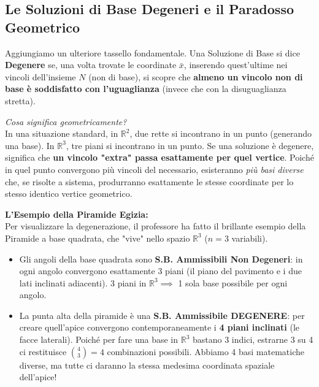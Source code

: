 \documentclass[12pt, a4paper]{article}
\newcommand{\separatore}{\noindent{\color{titlecolor!50}\rule{\textwidth}{0.6pt}}}
\begin{document}
	\vspace{0.6cm}
	\separatore
	\vspace{0.4cm}
	
	\subsection*{Le Soluzioni di Base Degeneri e il Paradosso Geometrico}
	
	Aggiungiamo un ulteriore tassello fondamentale. Una Soluzione di Base si dice \textbf{Degenere} se, una volta trovate le coordinate $\bar{x}$, inserendo quest'ultime nei vincoli dell'insieme $N$ (non di base), si scopre che \textbf{almeno un vincolo non di base è soddisfatto con l'uguaglianza} (invece che con la disuguaglianza stretta).
	
	\textit{Cosa significa geometricamente?}\\
	In una situazione standard, in $\mathbb{R}^2$, due rette si incontrano in un punto (generando una base). In $\mathbb{R}^3$, tre piani si incontrano in un punto. 
	Se una soluzione è degenere, significa che \textbf{un vincolo "extra" passa esattamente per quel vertice}. Poiché in quel punto convergono più vincoli del necessario, esisteranno \textit{più basi diverse} che, se risolte a sistema, produrranno esattamente le stesse coordinate per lo stesso identico vertice geometrico.
	
	\textbf{L'Esempio della Piramide Egizia:}\\
	Per visualizzare la degenerazione, il professore ha fatto il brillante esempio della Piramide a base quadrata, che "vive" nello spazio $\mathbb{R}^3$ ($n=3$ variabili).
	\begin{itemize}
		\item Gli angoli della base quadrata sono \textbf{S.B. Ammissibili Non Degeneri}: in ogni angolo convergono esattamente 3 piani (il piano del pavimento e i due lati inclinati adiacenti). 3 piani in $\mathbb{R}^3 \implies$ 1 sola base possibile per ogni angolo.
		\item La punta alta della piramide è una \textbf{S.B. Ammissibile DEGENERE}: per creare quell'apice convergono contemporaneamente i \textbf{4 piani inclinati} (le facce laterali). Poiché per fare una base in $\mathbb{R}^3$ bastano 3 indici, estrarne 3 su 4 ci restituisce $\binom{4}{3} = 4$ combinazioni possibili. Abbiamo 4 basi matematiche diverse, ma tutte ci daranno la stessa medesima coordinata spaziale dell'apice!
	\end{itemize}
	
\end{document}
